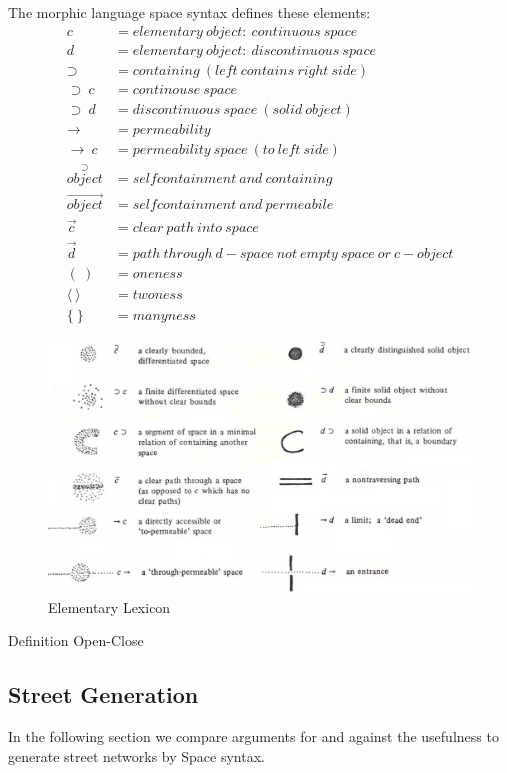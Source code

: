 \documentclass[11pt, a4paper]{report}
\begin{document}
The morphic language space syntax defines these elements:
\begin{align}
c &= elementary\ object:\ continuous\ space  \\
d &= elementary\ object:\ discontinuous\ space  \\
\supset &= containing\ (left\ contains\ right\ side)  \\
\supset\ c &= continouse\ space  \\
\supset\ d &= discontinuous\ space\ (solid\ object) \\
\rightarrow &= permeability \\
\rightarrow\ c &= permeability\ space\ (to\ left\ side) \\
\overset{\supset}{object} &= selfcontainment\ and\ containing \\
\overset{\rightarrow}{object} &= selfcontainment\ and\ permeabile \\
\overset{\rightarrow}{c} &= clear\ path\ into\ space \\
\overset{\rightarrow}{d} &= path\ through\ d-space\ not\ empty\ space\ or\ c-object \\
(\ ) &= oneness \\
\langle\ \rangle &= twoness \\
\{\ \} &= manyness
\end{align}

\begin{figure}[!h]
    \centering
    \includegraphics[width=\textwidth]{spacesyntax_elementary.png}
    \caption{Elementary Lexicon\citep{spaceSyntax:1976}}\label{fig:Space Syntax/Elementary Lexicon}
\end{figure}
\pagebreak

Definition Open-Close

\pagebreak
\subsection{Street Generation}
In the following section we compare arguments for and against the usefulness to generate street networks by Space syntax. 
\end{document}
